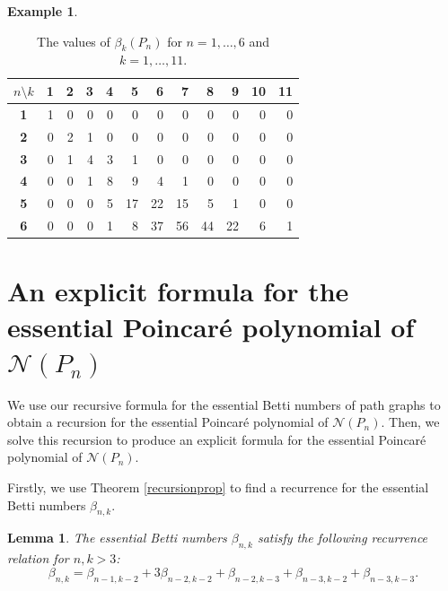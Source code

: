 \documentclass[12pt]{amsart}
\newtheorem{lem}[theorem]{Lemma}
\theoremstyle{definition}
\newtheorem{example}[theorem]{Example}
\begin{document}
\begin{example}
\begin{table}[H]
    \centering
    \label{tab:bnk_values}
    \setlength{\tabcolsep}{6pt}
    \renewcommand{\arraystretch}{1.2}
    \begin{tabular}{c|rrrrrrrrrrr}
        \toprule
        \boldmath$n \setminus k$ & \textbf{1} & \textbf{2} & \textbf{3} & \textbf{4} & \textbf{5} & \textbf{6} & \textbf{7} & \textbf{8} & \textbf{9} & \textbf{10} & \textbf{11} \\
        \midrule
        \textbf{1} & 1 & 0 & 0 & 0 & 0 & 0 & 0 & 0 & 0 & 0 & 0 \\
        \textbf{2} & 0 & 2 & 1 & 0 & 0 & 0 & 0 & 0 & 0 & 0 & 0 \\
        \textbf{3} & 0 & 1 & 4 & 3 & 1 & 0 & 0 & 0 & 0 & 0 & 0 \\
        \textbf{4} & 0 & 0 & 1 & 8 & 9 & 4 & 1 & 0 & 0 & 0 & 0 \\
        \textbf{5} & 0 & 0 & 0 & 5 & 17 & 22 & 15 & 5 & 1 & 0 & 0 \\
        \textbf{6} & 0 & 0 & 0 & 1 & 8 & 37 & 56 & 44 & 22 & 6 & 1 \\
        \bottomrule
    \end{tabular}
    \caption{The values of $\beta_k(P_n)$ for $n=1,\ldots,6$ and $k=1,\ldots,11$.}
\end{table}

\end{example}

\section{An explicit formula for the essential Poincar\'e polynomial of $\mathcal N(P_n)$}\label{sec:4}
We use our recursive formula for the essential Betti numbers of path graphs to obtain a recursion for the essential Poincar\'e polynomial of $\mathcal N(P_n)$. Then, we solve this recursion to produce an explicit formula for the essential Poincar\'e polynomial of $\mathcal N(P_n)$.

Firstly, we use Theorem \ref{recursionprop} to find a recurrence for the essential Betti numbers $\beta_{n,k}$. 

\begin{lem}\label{lem:28}
    The essential Betti numbers $\beta_{n,k}$ satisfy the following recurrence relation for $n,k>3$: \[\beta_{n,k} = \beta_{n-1,k-2} + 3\beta_{n-2,k-2} + \beta_{n-2,k-3} + \beta_{n-3,k-2} + \beta_{n-3,k-3}.\]
\end{lem}
\end{document}
